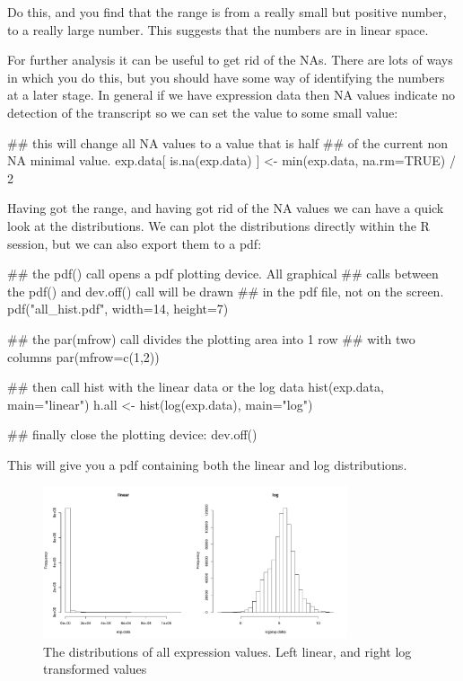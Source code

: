 \documentclass[11pt]{article}
\begin{document}
Do this, and you find that the range is from a really small
but positive number, to a really large number. This suggests
that the numbers are in linear space.

For further analysis it can be useful to get rid of the NAs. There
are lots of ways in which you do this, but you should have some
way of identifying the numbers at a later stage. In general if
we have expression data then NA values indicate no detection of the
transcript so we can set the value to some small value:

\begin{rcode}
  ## this will change all NA values to a value that is half
  ## of the current non NA minimal value.
  exp.data[ is.na(exp.data) ] <- min(exp.data, na.rm=TRUE) / 2
\end{rcode}

Having got the range, and having got rid of the NA values we can have
a quick look at the distributions. We can plot the distributions directly
within the R session, but we can also export them to a pdf:

\begin{rcode}
  ## the pdf() call opens a pdf plotting device. All graphical
  ## calls between the pdf() and dev.off() call will be drawn
  ## in the pdf file, not on the screen.
  pdf("all_hist.pdf", width=14, height=7)

  ## the par(mfrow) call divides the plotting area into 1 row
  ## with two columns
  par(mfrow=c(1,2))
  
  ## then call hist with the linear data or the log data
  hist(exp.data, main="linear")
  h.all <- hist(log(exp.data), main="log")

  ## finally close the plotting device:
  dev.off()
\end{rcode}

This will give you a pdf containing both the linear and log distributions.

\begin{figure}[ht]
  \includegraphics[width=0.8\textwidth]{images/all_hist.pdf}
  \caption{The distributions of all expression values. Left linear, and
    right log transformed values}
  \label{allhist}
\end{figure}
\end{document}
